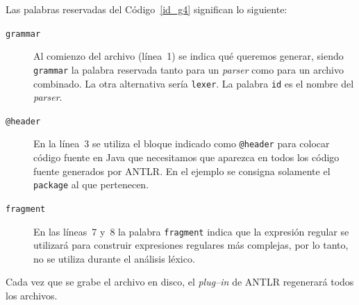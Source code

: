 \documentclass[a5paper,10pt]{article}
\begin{document}
Las palabras reservadas del Código~\ref{id_g4} significan lo siguiente:
\begin{description}
	\item[\texttt{grammar}] Al comienzo del archivo (línea~1) se indica qué queremos generar, siendo \verb|grammar| la palabra reservada tanto para un \emph{parser} como para un archivo combinado. La otra alternativa sería \verb|lexer|.  La palabra \verb|id| es el nombre del \emph{parser}.
	\item[\texttt{@header}] En la línea~3 se utiliza el bloque indicado como \verb|@header| para colocar código fuente en Java que necesitamos que aparezca en todos los código fuente generados por ANTLR.  En el ejemplo se consigna solamente el \verb|package| al que pertenecen.
	\item[\texttt{fragment}] En las líneas~7 y~8 la palabra \verb|fragment| indica que la expresión regular se utilizará para construir expresiones regulares más complejas, por lo tanto, no se utiliza durante el análisis léxico.
\end{description}

Cada vez que se grabe el archivo en disco, el \emph{plug--in} de ANTLR regenerará todos los archivos.
\end{document}
